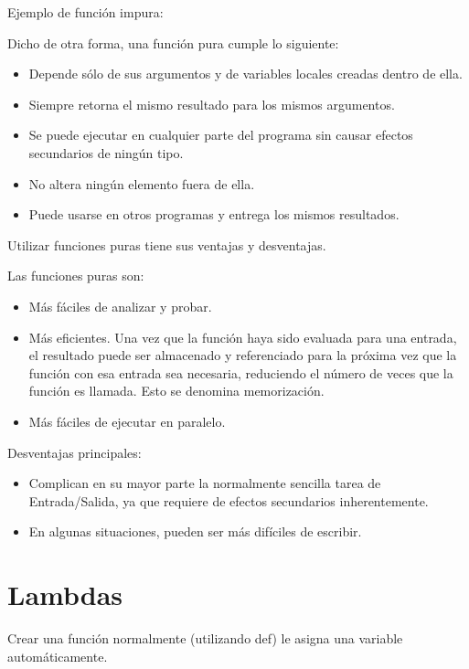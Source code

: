 \documentclass{report}
\begin{document}
{Ejemplo de función impura:


Dicho de otra forma, una función pura cumple lo siguiente:

\begin{itemize}
  \item Depende sólo de sus argumentos y de variables locales creadas dentro de ella.
  \item Siempre retorna el mismo resultado para los mismos argumentos.
  \item Se puede ejecutar en cualquier parte del programa sin causar efectos secundarios de ningún tipo.
  \item No altera ningún elemento fuera de ella.
  \item Puede usarse en otros programas y entrega los mismos resultados.
\end{itemize}

Utilizar funciones puras tiene sus ventajas y desventajas.

Las funciones puras son:

\begin{itemize}
  \item Más fáciles de analizar y probar.
  \item Más eficientes. Una vez que la función haya sido evaluada para una entrada, el resultado puede ser almacenado y referenciado para la próxima vez que la función con esa entrada sea necesaria, reduciendo el número de veces que la función es llamada. Esto se denomina memorización.
  \item Más fáciles de ejecutar en paralelo.
\end{itemize}

Desventajas principales:

\begin{itemize}
  \item Complican en su mayor parte la normalmente sencilla tarea de Entrada/Salida, ya que requiere de efectos secundarios inherentemente.
  \item En algunas situaciones, pueden ser más difíciles de escribir.
\end{itemize}

\section{Lambdas}

Crear una función normalmente (utilizando def) le asigna una variable automáticamente.

}
\end{document}
